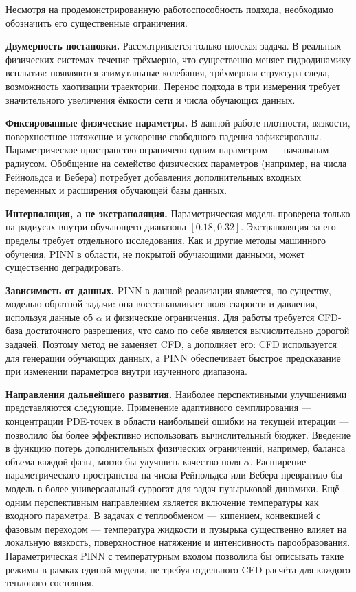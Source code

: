 \documentclass[12pt,a4paper]{article}
\begin{document}
Несмотря на продемонстрированную работоспособность подхода, необходимо
обозначить его существенные ограничения.

\textbf{Двумерность постановки.} Рассматривается только плоская задача. В
реальных физических системах течение трёхмерно, что существенно меняет
гидродинамику всплытия: появляются азимутальные колебания, трёхмерная структура
следа, возможность хаотизации траектории. Перенос подхода в три измерения
требует значительного увеличения ёмкости сети и числа обучающих данных.

\textbf{Фиксированные физические параметры.} В данной работе плотности,
вязкости, поверхностное натяжение и ускорение свободного падения зафиксированы.
Параметрическое пространство ограничено одним параметром --- начальным радиусом.
Обобщение на семейство физических параметров (например, на числа Рейнольдса и
Вебера) потребует добавления дополнительных входных переменных и расширения
обучающей базы данных.

\textbf{Интерполяция, а не экстраполяция.} Параметрическая модель проверена
только на радиусах внутри обучающего диапазона \([0.18, 0.32]\). Экстраполяция
за его пределы требует отдельного исследования. Как и другие методы машинного
обучения, PINN в области, не покрытой обучающими данными, может существенно
деградировать.

\textbf{Зависимость от данных.} PINN в данной реализации является, по существу,
моделью обратной задачи: она восстанавливает поля скорости и давления, используя
данные об \(\alpha\) и физические ограничения. Для работы требуется CFD-база
достаточного разрешения, что само по себе является вычислительно дорогой задачей.
Поэтому метод не заменяет CFD, а дополняет его: CFD используется для генерации
обучающих данных, а PINN обеспечивает быстрое предсказание при изменении
параметров внутри изученного диапазона.

\textbf{Направления дальнейшего развития.} Наиболее перспективными улучшениями
представляются следующие. Применение адаптивного семплирования --- концентрации
PDE-точек в области наибольшей ошибки на текущей итерации --- позволило бы
более эффективно использовать вычислительный бюджет. Введение в функцию потерь
дополнительных физических ограничений, например, баланса объема каждой фазы,
могло бы улучшить качество поля \(\alpha\). Расширение параметрического пространства на числа Рейнольдса или Вебера
превратило бы модель в более универсальный суррогат для задач пузырьковой
динамики. Ещё одним перспективным направлением является включение температуры
как входного параметра. В задачах с теплообменом --- кипением, конвекцией с
фазовым переходом --- температура жидкости и пузырька существенно влияет на
локальную вязкость, поверхностное натяжение и интенсивность парообразования.
Параметрическая PINN с температурным входом позволила бы описывать такие
режимы в рамках единой модели, не требуя отдельного CFD-расчёта для каждого
теплового состояния.
\end{document}
